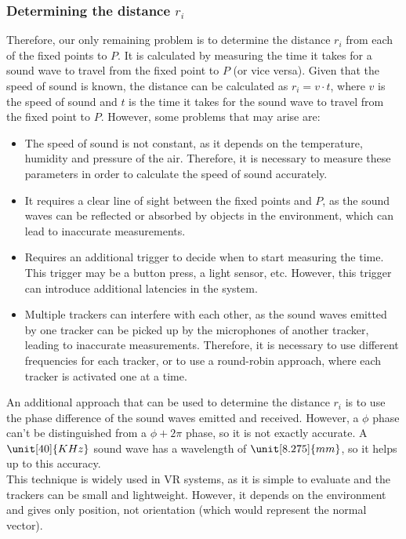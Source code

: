 \subsubsection{Determining the distance $r_i$}

Therefore, our only remaining problem is to determine the distance $r_i$ from each of the fixed points to $P$. It is calculated by measuring the time it takes for a sound wave to travel from the fixed point to $P$ (or vice versa). Given that the speed of sound is known, the distance can be calculated as $r_i=v\cdot t$, where $v$ is the speed of sound and $t$ is the time it takes for the sound wave to travel from the fixed point to $P$. However, some problems that may arise are:
\begin{itemize}
    \item The speed of sound is not constant, as it depends on the temperature, humidity and pressure of the air. Therefore, it is necessary to measure these parameters in order to calculate the speed of sound accurately.
    \item It requires a clear line of sight between the fixed points and $P$, as the sound waves can be reflected or absorbed by objects in the environment, which can lead to inaccurate measurements.
    \item Requires an additional trigger to decide when to start measuring the time. This trigger may be a button press, a light sensor, etc. However, this trigger can introduce additional latencies in the system.
    \item Multiple trackers can interfere with each other, as the sound waves emitted by one tracker can be picked up by the microphones of another tracker, leading to inaccurate measurements. Therefore, it is necessary to use different frequencies for each tracker, or to use a round-robin approach, where each tracker is activated one at a time.
\end{itemize}

An additional approach that can be used to determine the distance $r_i$ is to use the phase difference of the sound waves emitted and received. However, a $\phi$ phase can't be distinguished from a $\phi+2\pi$ phase, so it is not exactly accurate. A $\unit[40]{KHz}$ sound wave has a wavelength of $\unit[8.275]{mm}$, so it helps up to this accuracy.\\

This technique is widely used in VR systems, as it is simple to evaluate and the trackers can be small and lightweight. However, it depends on the environment and gives only position, not orientation (which would represent the normal vector).

